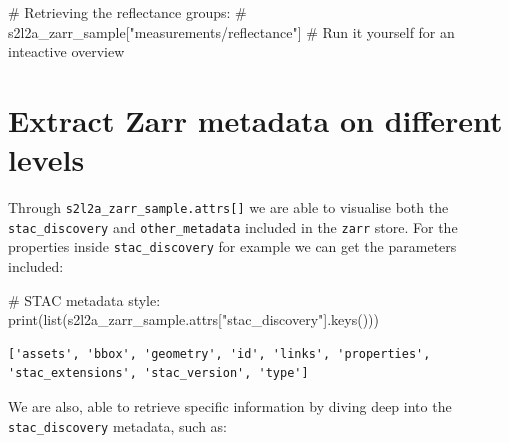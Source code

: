 \documentclass[
  letterpaper,
  DIV=11,
  numbers=noendperiod]{scrreprt}
\newenvironment{Shaded}{\begin{snugshade}}{\end{snugshade}}
\newcommand{\BuiltInTok}[1]{\textcolor[rgb]{0.00,0.23,0.31}{#1}}
\newcommand{\CommentTok}[1]{\textcolor[rgb]{0.37,0.37,0.37}{#1}}
\newcommand{\NormalTok}[1]{\textcolor[rgb]{0.00,0.23,0.31}{#1}}
\newcommand{\StringTok}[1]{\textcolor[rgb]{0.13,0.47,0.30}{#1}}
\begin{document}
\begin{Shaded}
\begin{Highlighting}[]
\CommentTok{\# Retrieving the reflectance groups:}
\CommentTok{\# s2l2a\_zarr\_sample["measurements/reflectance"] \# Run it yourself for an inteactive overview}
\end{Highlighting}
\end{Shaded}

\section{Extract Zarr metadata on different
levels}\label{extract-zarr-metadata-on-different-levels}

Through \texttt{s2l2a\_zarr\_sample.attrs{[}{]}} we are able to
visualise both the \texttt{stac\_discovery} and \texttt{other\_metadata}
included in the \texttt{zarr} store. For the properties inside
\texttt{stac\_discovery} for example we can get the parameters included:

\begin{Shaded}
\begin{Highlighting}[]
\CommentTok{\# STAC metadata style:}
\BuiltInTok{print}\NormalTok{(}\BuiltInTok{list}\NormalTok{(s2l2a\_zarr\_sample.attrs[}\StringTok{"stac\_discovery"}\NormalTok{].keys()))}
\end{Highlighting}
\end{Shaded}

\begin{verbatim}
['assets', 'bbox', 'geometry', 'id', 'links', 'properties', 'stac_extensions', 'stac_version', 'type']
\end{verbatim}

We are also, able to retrieve specific information by diving deep into
the \texttt{stac\_discovery} metadata, such as:
\end{document}
